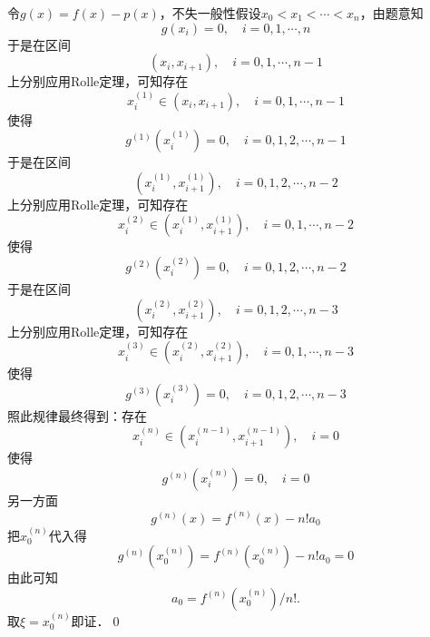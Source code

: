 \prove 令$g(x)=f(x)-p(x)$，不失一般性假设$x_0<x_1<\cdots<x_n$，由题意知
\begin{equation}
    g(x_i)=0,\quad i = 0,1,\cdots,n
\end{equation}
于是在区间
\begin{equation}
(x_i,x_{i+1}), \quad i=0,1,\cdots,n-1
\end{equation}
上分别应用Rolle定理，可知存在
\begin{equation}
x^{(1)}_i \in (x_{i},x_{i+1}), \quad i = 0,1,\cdots,n-1
\end{equation}
使得
\begin{equation}
g^{(1)}(x^{(1)}_i)=0, \quad i=0,1,2,\cdots,n-1
\end{equation}
于是在区间
\begin{equation}
(x^{(1)}_{i},x^{(1)}_{i+1}),\quad i=0,1,2,\cdots,n-2
\end{equation}
上分别应用Rolle定理，可知存在
\begin{equation}
x^{(2)}_{i}\in (x^{(1)}_{i},x^{(1)}_{i+1}), \quad i = 0,1,\cdots,n-2
\end{equation}
使得
\begin{equation}
g^{(2)}(x^{(2)}_i)=0, \quad i=0,1,2,\cdots,n-2
\end{equation}
于是在区间
\begin{equation}
    (x^{(2)}_{i},x^{(2)}_{i+1}),\quad i=0,1,2,\cdots,n-3
\end{equation}
上分别应用Rolle定理，可知存在
\begin{equation}
    x^{(3)}_{i}\in (x^{(2)}_{i},x^{(2)}_{i+1}), \quad i = 0,1,\cdots,n-3
\end{equation}
使得
\begin{equation}
g^{(3)}(x^{(3)}_i)=0, \quad i=0,1,2,\cdots,n-3
\end{equation}
照此规律最终得到：存在
\begin{equation}
    x^{(n)}_i \in (x^{(n-1)}_i, x^{(n-1)}_{i+1}), \quad i = 0
\end{equation}
使得
\begin{equation}
    g^{(n)}(x^{(n)}_i) = 0, \quad i = 0
\end{equation}
另一方面
\begin{equation}
    g^{(n)}(x) = f^{(n)}(x)-n!a_0
\end{equation}
把$x^{(n)}_{0}$代入得
\begin{equation}
    g^{(n)}(x^{(n)}_0) = f^{(n)}(x^{(n)}_0)-n!a_0 = 0
\end{equation}
由此可知
\begin{equation}
    a_0 = f^{(n)}(x^{(n)}_0)/n!.
\end{equation}
取$\xi = x^{(n)}_0$即证．\qed\bigskip

